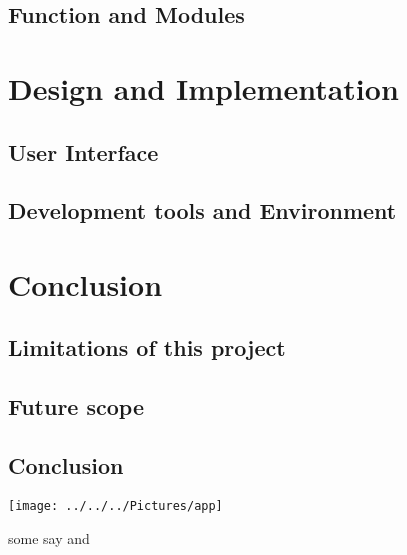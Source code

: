 \documentclass[a4paper, 12pt]{report}
\begin{document}
	\section{Function and Modules}
	\chapter{Design and Implementation}
	\section{User Interface}
	\section{Development tools and Environment}
	\chapter{Conclusion}
	\section{Limitations of this project}
	\section{Future scope}
	\section{Conclusion}
	\begin{center}
		\texttt{[image: ../../../Pictures/app]} %
	\end{center}
	some say \cite{doe2020signal} and \cite{smithe2019quantum}
	
	
	
\end{document}
